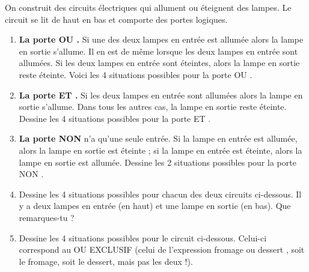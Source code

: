 \documentclass[class=report,crop=false, 12pt]{standalone}
\begin{document}
\begin{activite}
On construit des circuits électriques qui allument ou éteignent des lampes. Le circuit se lit de haut en bas et comporte des portes logiques.


\begin{enumerate}
  \item \textbf{La porte \og OU \fg{}.} Si une des deux lampes en entrée est allumée alors la lampe en sortie s'allume. Il en est de même lorsque les deux lampes en entrée sont allumées. Si les deux lampes en entrée sont éteintes, alors la lampe en sortie reste éteinte.
Voici les 4 situations possibles pour la porte \og OU \fg{}.




  \item \textbf{La porte \og ET \fg{}.} Si les deux lampes en entrée sont allumées alors la lampe en sortie s'allume. Dans tous les autres cas, la lampe en sortie reste éteinte.
Dessine les 4 situations possibles pour la porte \og ET \fg{}.



 
  \item \textbf{La porte \og NON \fg{}} n'a qu'une seule entrée. Si la lampe en entrée est allumée, alors la lampe en sortie est éteinte ; si la lampe en entrée est éteinte, alors la lampe en sortie est allumée. 
Dessine les 2 situations possibles pour la porte \og NON \fg{}.

  
  \item Dessine les 4 situations possibles pour chacun des deux circuits ci-dessous. Il y a deux lampes en entrée (en haut) et une lampe en sortie (en bas). Que remarques-tu ?
  
  

\bigskip



  
  \item Dessine les 4 situations possibles pour le circuit ci-dessous. Celui-ci correspond au \og OU EXCLUSIF \fg{} (celui de l'expression \og fromage ou dessert \fg{}, soit le fromage, soit le dessert, mais pas les deux !).
  

\end{enumerate}
\end{activite}
\end{document}
